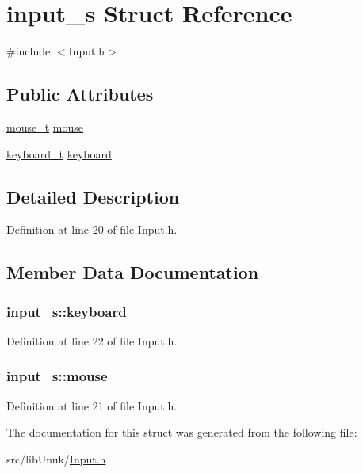 \hypertarget{structinput__s}{
\section{input\_\-s Struct Reference}
\label{structinput__s}
}


{\ttfamily \#include $<$Input.h$>$}

\subsection*{Public Attributes}
\begin{DoxyCompactItemize}
\item 
\hyperlink{structmouse__s}{mouse\_\-t} \hyperlink{structinput__s_a42cdf020f4fa11c8ea05af4623777d5d}{mouse}
\item 
\hyperlink{structkeyboard__s}{keyboard\_\-t} \hyperlink{structinput__s_ad22a779fec75367093a799b6321f0cd5}{keyboard}
\end{DoxyCompactItemize}


\subsection{Detailed Description}


Definition at line 20 of file Input.h.



\subsection{Member Data Documentation}
\hypertarget{structinput__s_ad22a779fec75367093a799b6321f0cd5}{
\subsubsection[{keyboard}]{ {\bf input\_\-s::keyboard}}}
\label{structinput__s_ad22a779fec75367093a799b6321f0cd5}


Definition at line 22 of file Input.h.

\hypertarget{structinput__s_a42cdf020f4fa11c8ea05af4623777d5d}{
\subsubsection[{mouse}]{ {\bf input\_\-s::mouse}}}
\label{structinput__s_a42cdf020f4fa11c8ea05af4623777d5d}


Definition at line 21 of file Input.h.



The documentation for this struct was generated from the following file:\begin{DoxyCompactItemize}
\item 
src/libUnuk/\hyperlink{_input_8h}{Input.h}\end{DoxyCompactItemize}
